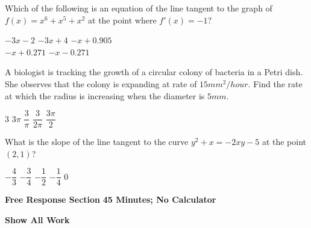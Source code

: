 \begin{questions}
    \newpage

    \question Which of the following is an equation of the line tangent to the graph of $f(x) = x^6 + x^5 + x^2$ at the point where $f'(x) = -1$? \\

    \begin{oneparchoices}
        \choice $-3x - 2$
        \choice $-3x + 4$
        \choice $-x + 0.905$ \\[11pt]
        \makebox[0.23 \textwidth] \choice $-x + 0.271$
        \makebox[0.27 \textwidth]\choice $-x - 0.271$
    \end{oneparchoices} \par \horizontalline

    \question A biologist is tracking the growth of a circular colony of bacteria in a Petri dish. She observes that the colony is expanding at rate of $15 \si{mm^2 \per hour}$. Find the rate at which the radius is increasing when the diameter is $5 \si{mm}$. \\

    \begin{oneparchoices}
        \choice $3$
        \choice $3\pi$
        \choice $\dfrac{3}{\pi}$
        \choice $\dfrac{3}{2\pi}$
        \choice $\dfrac{3\pi}{2}$
    \end{oneparchoices} \par \horizontalline

    \question What is the slope of the line tangent to the curve $y^2 + x = -2xy - 5$ at the point $(2, 1)$? \\

    \begin{oneparchoices}
        \choice $-\dfrac{4}{3}$
        \choice $-\dfrac{3}{4}$
        \choice $-\dfrac{1}{2}$
        \choice $-\dfrac{1}{4}$
        \choice $0$
    \end{oneparchoices} \par \horizontalline
\end{questions}

\newpage
{}

\textbf{Free Response Section} \hfill \textbf{45 Minutes; No Calculator} \\[11pt]

\begin{center}
    \textbf{Show All Work}
\end{center}
\vspace{11pt}


